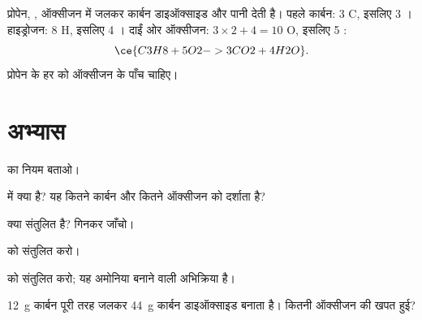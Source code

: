 \begin{example}[कैंपिंग स्टोव में प्रोपेन]\label{ex:g8:balanced-equations:propane}
प्रोपेन, , ऑक्सीजन में जलकर कार्बन डाइऑक्साइड और पानी देती है।
पहले कार्बन: 3 C, इसलिए 3 । हाइड्रोजन: 8 H, इसलिए 4 । दाईं
ओर ऑक्सीजन: $3 \times 2 + 4 = 10$ O, इसलिए 5 :
\[
  \ce{C3H8 + 5O2 -> 3CO2 + 4H2O}.
\]
प्रोपेन के हर  को ऑक्सीजन के पाँच  चाहिए।
\end{example}

\section{अभ्यास}

\begin{exercise}[$\star$]\label{exo:g8:balanced-equations:1}
 का नियम बताओ।
\end{exercise}

\begin{exercise}[$\star$]\label{exo:g8:balanced-equations:2}
 में  क्या है? यह कितने कार्बन 
और कितने ऑक्सीजन  को दर्शाता है?
\end{exercise}

\begin{exercise}[$\star$]\label{exo:g8:balanced-equations:3}
क्या  संतुलित है?  गिनकर जाँचो।
\end{exercise}

\begin{exercise}[$\star$]\label{exo:g8:balanced-equations:4}
 को संतुलित करो। %
\end{exercise}

\begin{exercise}[$\star\star$]\label{exo:g8:balanced-equations:5}
 को संतुलित करो; यह अमोनिया बनाने वाली अभिक्रिया है। %
\end{exercise}

\begin{exercise}[$\star\star$]\label{exo:g8:balanced-equations:6}
\qty{12}{g} कार्बन पूरी तरह जलकर \qty{44}{g} कार्बन
डाइऑक्साइड बनाता है। कितनी ऑक्सीजन की खपत हुई?
\end{exercise}

